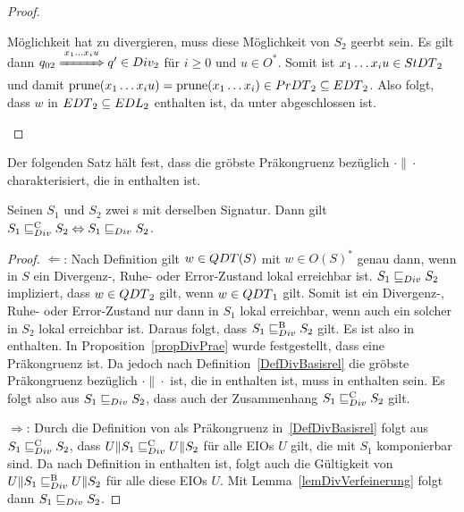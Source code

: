 \begin{proof}
\begin{itemize}
\begin{itemize}
          Möglichkeit hat zu divergieren, muss diese Möglichkeit von $S_2$
          geerbt sein. Es gilt dann $q_{02} \overset{x_1\dots
          x_iu}{\xRightarrow{\hspace{1cm}}} q'\in Div_2$ für $i\geq 0$ und $u\in O^*$. Somit
          ist $x_1\dots x_iu\in StDT{}_2$ und damit $\mathrm{prune}{}(x_1\dots x_iu)=
          \mathrm{prune}{}(x_1\dots x_i)\in PrDT{}_2\subseteq EDT{}_2$. Also folgt,
          dass $w$ in $EDT{}_2 \subseteq EDL{}_2$ enthalten ist, da \DT{}
          unter \cont{} abgeschlossen ist.
      \end{itemize}
  \end{itemize}
\end{proof}

Der folgenden Satz hält fest, dass \DRel{} die gröbste Präkongruenz bezüglich
$\cdot\|\cdot$ charakterisiert, die in \DBRel{} enthalten ist.

\begin{satz}
\label{satzDivFullAbst}
  Seinen $S_1$ und $S_2$ zwei \EIO{}s mit derselben Signatur. Dann gilt $S_1
  \sqsubseteq _{Div}^\mathrm{C}{} S_2\Leftrightarrow S_1\sqsubseteq _{Div}{} S_2$.
\end{satz}

\begin{proof}
  \glqq{}$\Leftarrow$\grqq{}: Nach Definition gilt $w\in QDT{}(S)$ mit $w\in
  O(S)^*$ genau dann, wenn in $S$ ein Divergenz-, Ruhe- oder Error-Zustand
  lokal erreichbar ist. $S_1\sqsubseteq _{Div} S_2$ impliziert, dass
  $w\in QDT{}_2$ gilt, wenn $w\in QDT{}_1$ gilt. Somit ist ein Divergenz-,
  Ruhe- oder Error-Zustand nur dann in $S_1$ lokal erreichbar,
  wenn auch ein solcher in $S_2$ lokal erreichbar ist. Daraus folgt, dass
  $S_1\sqsubseteq _{Div}^\mathrm{B} S_2$ gilt. Es ist also \DRel{} in \DBRel{} enthalten. In
  Proposition~\ref{propDivPrae} wurde festgestellt, dass \DRel{} eine
  Präkongruenz ist. Da jedoch \DCRel{} nach Definition~\ref{DefDivBasisrel} die gröbste Präkongruenz
  bezüglich $\cdot\|\cdot$ ist, die in \DBRel{} enthalten ist, muss \DRel{} in
  \DCRel{} enthalten sein. Es folgt also aus $S_1\sqsubseteq _{Div} S_2$,
  dass auch der Zusammenhang $S_1\sqsubseteq _{Div}^\mathrm{C} S_2$ gilt.

  \glqq{}$\Rightarrow$\grqq{}: Durch die Definition von \DCRel{} als
  Präkongruenz in~\ref{DefDivBasisrel} folgt aus $S_1\sqsubseteq _{Div}^\mathrm{C}{} S_2$, dass
  $U\|S_1\sqsubseteq _{Div}^\mathrm{C} U\|S_2$ für alle EIOs $U$ gilt, die mit $S_1$ komponierbar sind.
  Da \DCRel{} nach Definition in \DBRel{} enthalten ist, folgt auch die
  Gültigkeit von $U\|S_1\sqsubseteq _{Div}^\mathrm{B} U\|S_2$ für alle diese EIOs $U$. Mit
  Lemma~\ref{lemDivVerfeinerung} folgt dann $S_1\sqsubseteq _{Div}{} S_2$.
\end{proof}

